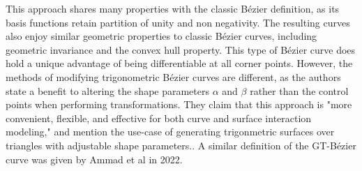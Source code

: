 \documentclass{article}
\begin{document}
This approach shares many properties with the classic Bézier definition, as its basis functions retain partition of unity and non negativity. The resulting curves also enjoy similar geometric properties to classic Bézier curves, including geometric invariance and the convex hull property.\cite{abbas-maqsood-hu-ramli-miura20} This type of Bézier curve does hold a unique advantage of being differentiable at all corner points. However, the methods of modifying trigonometric Bézier curves are different, as the authors state a benefit to altering the shape parameters $\alpha$ and $\beta$ rather than the control points when performing transformations. They claim that this approach is "more convenient, flexible, and effective for both curve and surface interaction modeling," and mention the use-case of generating trigonmetric surfaces over triangles with adjustable shape parameters.\cite{abbas-maqsood-hu-ramli-miura20}. A similar definition of the GT-Bézier curve was given by Ammad et al in 2022.\cite{gt-bez22}



\pagebreak



\end{document}

